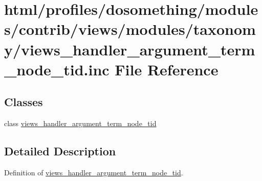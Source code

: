 \hypertarget{views__handler__argument__term__node__tid_8inc}{
\section{html/profiles/dosomething/modules/contrib/views/modules/taxonomy/views\_\-handler\_\-argument\_\-term\_\-node\_\-tid.inc File Reference}
\label{views__handler__argument__term__node__tid_8inc}
}
\subsection*{Classes}
\begin{DoxyCompactItemize}
\item 
class \hyperlink{classviews__handler__argument__term__node__tid}{views\_\-handler\_\-argument\_\-term\_\-node\_\-tid}
\end{DoxyCompactItemize}


\subsection{Detailed Description}
Definition of \hyperlink{classviews__handler__argument__term__node__tid}{views\_\-handler\_\-argument\_\-term\_\-node\_\-tid}. 